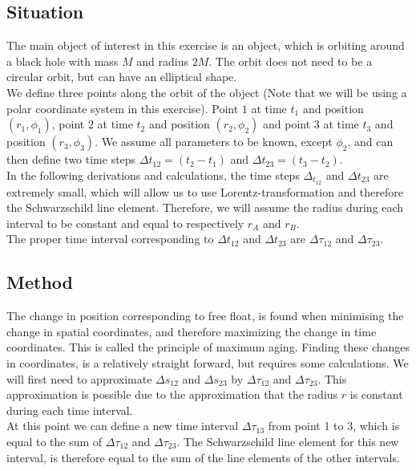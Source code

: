 \documentclass[reprint,english,notitlepage]{revtex4-2}
\begin{document}
    \subsection{Situation}\label{subsec:situation2}
        The main object of interest in this exercise is an object, which is orbiting around a black hole with mass $M$ and radius $2M$.
        The orbit does not need to be a circular orbit, but can have an elliptical shape.\\
        We define three points along the orbit of the object (Note that we will be using a polar coordinate system in this exercise).
        Point $1$ at time $t_1$ and position $(r_1, \phi_1)$, point $2$ at time $t_2$ and position $(r_2, \phi_2)$ and point $3$ at time $t_3$ and position $(r_3, \phi_3)$.
        We assume all parameters to be known, except $\phi_2$, and can then define two time steps $\Delta t_{12} = (t_2-t_1)$ and $\Delta t_{23} = (t_3-t_2)$.\\

        In the following derivations and calculations, the time steps $\Delta_t_{12}$ and $\Delta t_{23}$ are extremely small, which will allow us to use Lorentz-transformation and therefore the Schwarzschild line element.
        Therefore, we will assume the radius during each interval to be constant and equal to respectively $r_A$ and $r_B$.\\

        The proper time interval corresponding to $\Delta t_{12}$ and $\Delta t_{23}$ are $\Delta\tau_{12}$ and $\Delta\tau_{23}$.

    \subsection{Method}\label{subsec:method2}
        The change in position corresponding to free float, is found when minimising the change in spatial coordinates, and therefore maximizing the change in time coordinates.
        This is called the principle of maximum aging.
        Finding these changes in coordinates, is a relatively straight forward, but requires some calculations.
        We will first need to approximate $\Delta s_{12}$ and $\Delta s_{23}$ by $\Delta \tau_{12}$ and $\Delta \tau_{23}$.
        This approximation is possible due to the approximation that the radius $r$ is constant during each time interval.\\

        At this point we can define a new time interval $\Delta \tau_{13}$ from point 1 to 3, which is equal to the sum of $\Delta \tau_{12}$ and $\Delta\tau_{23}$.
        The Schwarzschild line element for this new interval, is therefore equal to the sum of the line elements of the other intervals.\\
\end{document}
